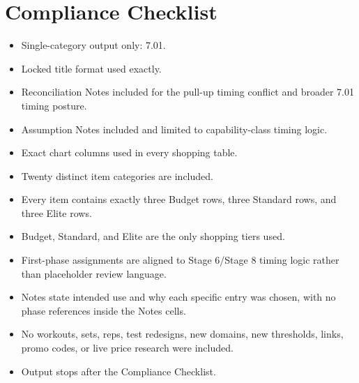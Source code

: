 \documentclass[10pt]{article}
\begin{document}
\clearpage

\section*{Compliance Checklist}
{}

\begin{itemize}
\item Single-category output only: 7.01.
\item Locked title format used exactly.
\item Reconciliation Notes included for the pull-up timing conflict and broader 7.01 timing posture.
\item Assumption Notes included and limited to capability-class timing logic.
\item Exact chart columns used in every shopping table.
\item Twenty distinct item categories are included.
\item Every item contains exactly three Budget rows, three Standard rows, and three Elite rows.
\item Budget, Standard, and Elite are the only shopping tiers used.
\item First-phase assignments are aligned to Stage 6/Stage 8 timing logic rather than placeholder review language.
\item Notes state intended use and why each specific entry was chosen, with no phase references inside the Notes cells.
\item No workouts, sets, reps, test redesigns, new domains, new thresholds, links, promo codes, or live price research were included.
\item Output stops after the Compliance Checklist.
\end{itemize}
\end{document}
